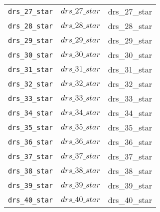 \begin{center}
\begin{longtable}{ccc}
\texttt{drs\_27\_star} & $drs\_27\_star$ & drs\_27\_star\\
\texttt{drs\_28\_star} & $drs\_28\_star$ & drs\_28\_star\\
\texttt{drs\_29\_star} & $drs\_29\_star$ & drs\_29\_star\\
\texttt{drs\_30\_star} & $drs\_30\_star$ & drs\_30\_star\\
\texttt{drs\_31\_star} & $drs\_31\_star$ & drs\_31\_star\\
\texttt{drs\_32\_star} & $drs\_32\_star$ & drs\_32\_star\\
\texttt{drs\_33\_star} & $drs\_33\_star$ & drs\_33\_star\\
\texttt{drs\_34\_star} & $drs\_34\_star$ & drs\_34\_star\\
\texttt{drs\_35\_star} & $drs\_35\_star$ & drs\_35\_star\\
\texttt{drs\_36\_star} & $drs\_36\_star$ & drs\_36\_star\\
\texttt{drs\_37\_star} & $drs\_37\_star$ & drs\_37\_star\\
\texttt{drs\_38\_star} & $drs\_38\_star$ & drs\_38\_star\\
\texttt{drs\_39\_star} & $drs\_39\_star$ & drs\_39\_star\\
\texttt{drs\_40\_star} & $drs\_40\_star$ & drs\_40\_star\\
\hline%
\end{longtable}
\end{center}
